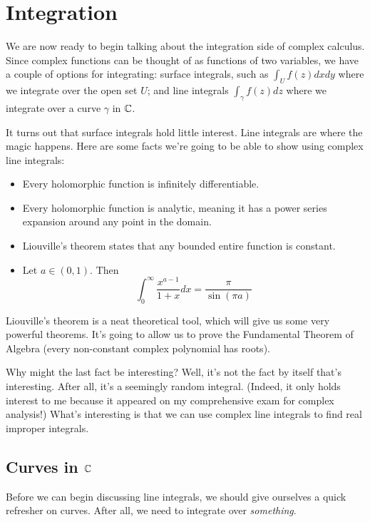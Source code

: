 \chapter{Integration}

We are now ready to begin talking about the integration side of complex calculus. Since complex functions can be thought of as functions of two variables, we have a couple of options for integrating: surface integrals, such as $\int_{U} f(z)dxdy$ where we integrate over the open set $U$; and line integrals $\int_{\gamma} f(z)dz$ where we integrate over a curve $\gamma$ in $\mathbb{C}$.

It turns out that surface integrals hold little interest. Line integrals are where the magic happens. Here are some facts we're going to be able to show using complex line integrals:

\begin{itemize}
\item Every holomorphic function is infinitely differentiable.
\item Every holomorphic function is analytic, meaning it has a power series expansion around any point in the domain.
\item Liouville's theorem states that any bounded entire function is constant.
\item Let $a\in (0,1)$. Then 
$$\int_0^\infty \frac{x^{a - 1}}{1 + x}dx = \frac{\pi}{\sin(\pi a)}$$
\end{itemize}

Liouville's theorem is a neat theoretical tool, which will give us some very powerful theorems. It's going to allow us to prove the Fundamental Theorem of Algebra (every non-constant complex polynomial has roots). 

Why might the last fact be interesting? Well, it's not the fact by itself that's interesting. After all, it's a seemingly random integral. (Indeed, it only holds interest to me because it appeared on my comprehensive exam for complex analysis!) What's interesting is that we can use complex line integrals to find real improper integrals.

\section{Curves in $\mathbb{C}$}

Before we can begin discussing line integrals, we should give ourselves a quick refresher on curves. After all, we need to integrate over {\it something}.

